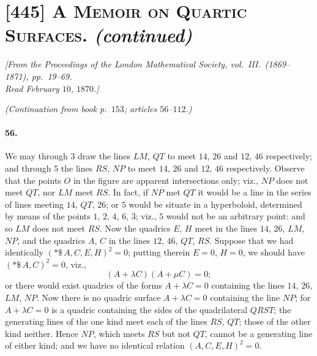 \documentclass[11pt,a4paper]{article}
\begin{document}
\section*{[445] \textsc{A Memoir on Quartic Surfaces.} \textit{(continued)}}

\begin{center}
\textit{[From the Proceedings of the London Mathematical Society, vol.\ III.\ (1869--1871), pp.\ 19--69.\\
Read February $10$, $1870$.]}
\end{center}

\medskip
\noindent\textit{(Continuation from book p.\ $153$; articles $56$--$112$.)}

\bigskip

\paragraph{56.}
We may through $3$ draw the lines $LM$, $QT$ to meet $14$, $26$ and $12$, $46$
respectively; and through $5$ the lines $RS$, $NP$ to meet $14$, $26$ and $12$, $46$
respectively. Observe that the points $O$ in the figure are apparent intersections only;
viz., $NP$ does not meet $QT$, nor $LM$ meet $RS$. In fact, if $NP$ met $QT$ it would
be a line in the series of lines meeting $14$, $QT$, $26$; or $5$ would be situate in
a hyperboloid, determined by means of the points $1$, $2$, $4$, $6$, $3$; viz., $5$
would not be an arbitrary point: and so $LM$ does not meet $RS$. Now the quadrics
$E$, $H$ meet in the lines $14$, $26$, $LM$, $NP$, and the quadrics $A$, $C$ in the
lines $12$, $46$, $QT$, $RS$. Suppose that we had identically
$(*\$\,A, C, E, H)^2 = 0$; putting therein $E = 0$, $H = 0$, we should have
$(*\$\,A, C)^2 = 0$, viz.,
\[
(A + \lambda C)(A + \mu C) = 0;
\]
or there would exist quadrics of the forms $A + \lambda C = 0$ containing the lines
$14$, $26$, $LM$, $NP$. Now there is no quadric surface $A + \lambda C = 0$ containing
the line $NP$; for $A + \lambda C = 0$ is a quadric containing the sides of the
quadrilateral $QRST$; the generating lines of the one kind meet each of the lines $RS$,
$QT$; those of the other kind neither. Hence $NP$, which meets $RS$ but not $QT$,
cannot be a generating line of either kind; and we have no identical relation
$(A, C, E, H)^2 = 0$.
\end{document}
